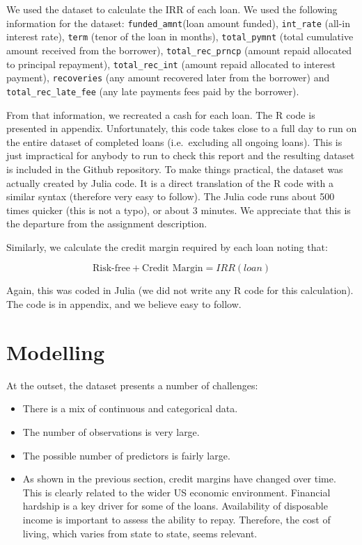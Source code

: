 \documentclass[11pt,]{report}
\begin{document}
We used the dataset to calculate the IRR of each loan. We used the following information for the dataset: \texttt{funded\_amnt}(loan amount funded), \texttt{int\_rate} (all-in interest rate), \texttt{term} (tenor of the loan in months), \texttt{total\_pymnt} (total cumulative amount received from the borrower), \texttt{total\_rec\_prncp} (amount repaid allocated to principal repayment), \texttt{total\_rec\_int} (amount repaid allocated to interest payment), \texttt{recoveries} (any amount recovered later from the borrower) and \texttt{total\_rec\_late\_fee} (any late payments fees paid by the borrower).

From that information, we recreated a cash for each loan. The R code is presented in appendix. Unfortunately, this code takes close to a full day to run on the entire dataset of completed loans (i.e.~excluding all ongoing loans). This is just impractical for anybody to run to check this report and the resulting dataset is included in the Github repository. To make things practical, the dataset was actually created by Julia code. It is a direct translation of the R code with a similar syntax (therefore very easy to follow). The Julia code runs about 500 times quicker (this is not a typo), or about 3 minutes. We appreciate that this is the departure from the assignment description.

Similarly, we calculate the credit margin required by each loan noting that:

\[ \text{Risk-free} + \text{Credit Margin} = IRR(loan)\]

Again, this was coded in Julia (we did not write any R code for this calculation). The code is in appendix, and we believe easy to follow.

\hypertarget{modelling}{%
\chapter{Modelling}\label{modelling}}

At the outset, the dataset presents a number of challenges:

\begin{itemize}
\item
  There is a mix of continuous and categorical data.
\item
  The number of observations is very large.
\item
  The possible number of predictors is fairly large.
\item
  As shown in the previous section, credit margins have changed over time. This is clearly related to the wider US economic environment. Financial hardship is a key driver for some of the loans. Availability of disposable income is important to assess the ability to repay. Therefore, the cost of living, which varies from state to state, seems relevant.
\end{itemize}
\end{document}
